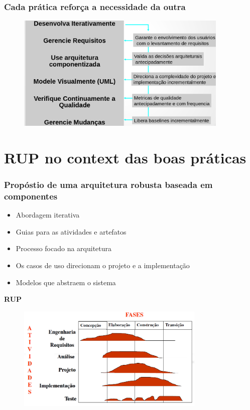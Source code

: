 \begin{frame}
\frametitle{Cada prática reforça a necessidade da outra}
\begin{figure}
   \centering
   \includegraphics[width = 0.9\textwidth]{figs/fig18.png}
  \end{figure}
\end{frame}
\section{RUP no context das boas práticas}

\begin{frame}
 \frametitle{Propóstio de uma arquitetura robusta baseada em componentes}
  \begin{minipage}[t]{0.48\linewidth}
  \begin{itemize}
   \item Abordagem iterativa
  \item Guias para as atividades e artefatos
  \item Processo focado na arquitetura
  \item Os casos de uso direcionam o projeto e a implementação
  \item Modelos que abstraem o sistema
  \end{itemize}
 \end{minipage}
\begin{minipage}[t]{0.48\linewidth}
\textbf{RUP}
  \begin{figure}
   \centering
   \includegraphics[width = 0.8\textwidth]{figs/fig19.png}
  \end{figure}
\end{minipage}

\end{frame}

